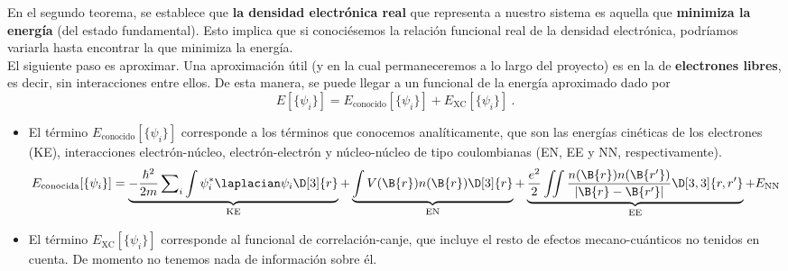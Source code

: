 En el segundo teorema, se establece que \textbf{la densidad electrónica real} que representa a nuestro sistema es aquella que \textbf{minimiza la energía} (del estado fundamental). Esto implica que si conociésemos la relación funcional real de la densidad electrónica, podríamos variarla hasta encontrar la que minimiza la energía.\\

El siguiente paso es aproximar. Una aproximación útil (y en la cual permaneceremos a lo largo del proyecto) es en la de \textbf{electrones libres}, es decir, sin interacciones entre ellos. De esta manera, se puede llegar a un funcional de la energía aproximado dado por
\begin{equation} \label{1.1}
    E[\{ \psi_i \}] = E_\text{conocido}[\{ \psi_i \}] + E_\text{XC}[\{ \psi_i \}] \ .
\end{equation}
\begin{itemize}
    \item El término $E_\text{conocido}[\{ \psi_i \}]$ corresponde a los términos que conocemos analíticamente, que son las energías cinéticas de los electrones (KE), interacciones electrón-núcleo, electrón-electrón y núcleo-núcleo de tipo coulombianas (EN, EE y NN, respectivamente).
    \begin{equation}
        E_\text{conocida}[\{ \psi_i \}]=\underbrace{-\frac{\hbar^2}{2m} \sum\nolimits_i \int \psi_i^* \laplacian \psi_i \D[3]{r}}_{\text{KE}} + \underbrace{\int V(\B{r})n(\B{r}) \D[3]{r}}_{\text{EN}} + \underbrace{\frac{e^2}{2}\iint \frac{n(\B{r})n(\B{r'})}{|\B{r}-\B{r'}|} \D[3,3]{r,r'}}_{\text{EE}} + E_\text{NN}
    \end{equation}

    \item El término $E_\text{XC}[\{ \psi_i \}]$ corresponde al funcional de correlación-canje, que incluye el resto de efectos mecano-cuánticos no tenidos en cuenta. De momento no tenemos nada de información sobre él.
\end{itemize}

